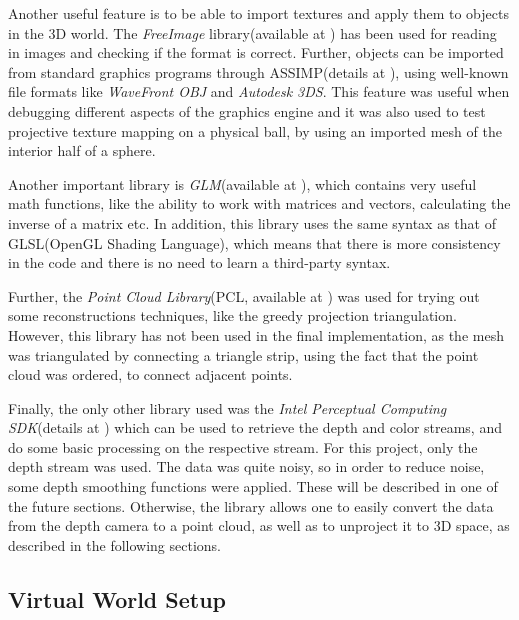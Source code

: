 \documentclass[]{article}
\begin{document}
Another useful feature is to be able to import textures and apply them to objects in the 3D world. The \textit{FreeImage} library(available at \cite{freeimage}) has been used for reading in images and checking if the format is correct. Further, objects can be imported from standard graphics programs through ASSIMP(details at \cite{assimp}), using well-known file formats like \textit{WaveFront OBJ} and \textit{Autodesk 3DS}. This feature was useful when debugging different aspects of the graphics engine and it was also used to test projective texture mapping on a physical ball, by using an imported mesh of the interior half of a sphere.

Another important library is \textit{GLM}(available at \cite{GLM}), which contains very useful math functions, like the ability to work with matrices and vectors, calculating the inverse of a matrix etc. In addition, this library uses the same syntax as that of GLSL(OpenGL Shading Language), which means that there is more consistency in the code and there is no need to learn a third-party syntax.

Further, the \textit{Point Cloud Library}(PCL, available at \cite{PCL}) was used for trying out some reconstructions techniques, like the greedy projection triangulation. However, this library has not been used in the final implementation, as the mesh was triangulated by connecting a triangle strip, using the fact that the point cloud was ordered, to connect adjacent points.

Finally, the only other library used was the \textit{Intel Perceptual Computing SDK}(details at \cite{PCSDK}) which can be used to retrieve the depth and color streams, and do some basic processing on the respective stream. For this project, only the depth stream was used. The data was quite noisy, so in order to reduce noise, some depth smoothing functions were applied. These will be described in one of the future sections. Otherwise, the library allows one to easily convert the data from the depth camera to a point cloud, as well as to unproject it to 3D space, as described in the following sections.

\subsection{Virtual World Setup}
\end{document}
